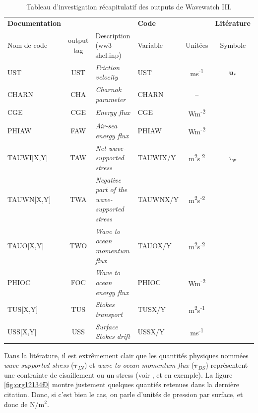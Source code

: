 \documentclass[10pt]{article}
\numberwithin{equation}{section}
\newcommand{\ust}{\vb{u}_{\ast}}
\begin{document}
\begin{table}[htbp]
\caption{\label{tab:orge81af88}Tableau d'investigation récapitulatif des outputs de Wavewatch III.}
\centering
\begin{tabular}{lcl|lc|c}
\hline
\hline
\textbf{Documentation} &  &  & \textbf{Code} &  & \textbf{Litérature}\\
Nom de code & output tag & Description (ww3 shel.inp) & Variable & Unitées & Symbole\\
\hline
UST & UST & \emph{Friction velocity} & UST & ms\textsuperscript{-1} & \(\ust\)\\
CHARN & CHA & \emph{Charnok parameter} & CHARN & -- & \\
CGE & CGE & \emph{Energy flux} & CGE & Wm\textsuperscript{-2} & \\
PHIAW & FAW & \emph{Air-sea energy flux} & PHIAW & Wm\textsuperscript{-2} & \\
TAUWI[X,Y] & TAW & \emph{Net wave-supported stress} & TAUWIX/Y & m\textsuperscript{2}s\textsuperscript{-2} & \(\tau\)\textsubscript{w}\\
TAUWN[X,Y] & TWA & \emph{Negative part of the wave-supported stress} & TAUWNX/Y & m\textsuperscript{2}s\textsuperscript{-2} & \\
\hline
TAUO[X,Y] & TWO & \emph{Wave to ocean momentum flux} & TAUOX/Y & m\textsuperscript{2}s\textsuperscript{-2} & \\
PHIOC & FOC & \emph{Wave to ocean energy flux} & PHIOC & Wm\textsuperscript{-2} & \\
TUS[X,Y] & TUS & \emph{Stokes transport} & TUSX/Y & m\textsuperscript{2}s\textsuperscript{-1} & \\
USS[X,Y] & USS & \emph{Surface Stokes drift} & USSX/Y & ms\textsuperscript{-1} & \\
\hline
\end{tabular}
\end{table}

Dans la litérature, il est extrêmement clair que les quantités physiques nommées \emph{wave-supported stress} (\(\boldsymbol{\tau}_{IN}\)) et \emph{wave to ocean momentum flux} (\(\boldsymbol{\tau}_{DS}\)) représentent une contrainte de cisaillement ou un stress (voir \Textcite{breivik_al_2015}, \Textcite{ardhuin2010semiempirical} et \Textcite{couvelard2020development} en exemple).
La figure \ref{fig:org12134f0} montre justement quelques quantiés retenues dans la dernière citation.
Donc, si c'est bien le cas, on parle d'unités de pression par surface, et donc de \(\mathrm{N}/\mathrm{m}^2\).\bigskip
\end{document}
